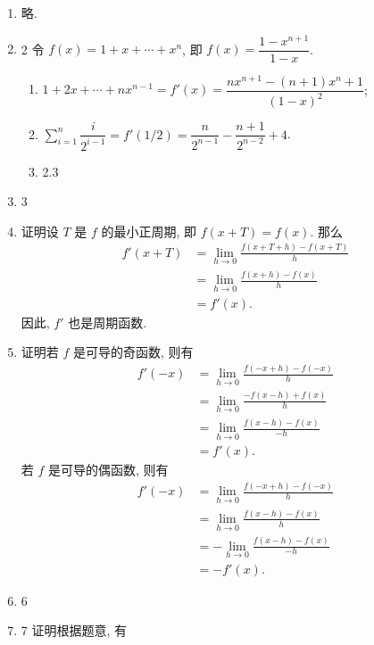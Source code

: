 \documentclass[a4paper, 11pt]{ctexart}
\begin{document}
\pagestyle{empty}
\begin{enumerate}
    \item %
        略.
    \item 2
        令 $f(x) = 1 + x + \cdots + x^n$, 即 $f(x) = \dfrac{1-x^{n+1}}{1-x}$.
        \begin{enumerate}[(1)]
            \item %
                $1 + 2x + \cdots + nx^{n-1} = f'(x) = \dfrac{nx^{n+1} - (n+1)x^n + 1}{(1-x)^2}$;
            \item %
                $\sum\limits_{i=1}^n\dfrac{i}{2^{i-1}} = f'(1/2) = \dfrac{n}{2^{n-1}} - \dfrac{n+1}{2^{n-2}} + 4$.
            \item 2.3
        \end{enumerate}
    \item 3
    \item %
        {\heiti 证明}\quad 设 $T$ 是 $f$ 的最小正周期, 即 $f(x + T) = f(x)$. 那么
        \begin{align*}
            f'(x + T) &= \lim_{h\to0}\frac{f(x+T+h) - f(x+T)}{h} \\
                      &= \lim_{h\to0}\frac{f(x+h) - f(x)}{h} \\
                      &= f'(x).    
        \end{align*}
        因此, $f'$ 也是周期函数.
    \item %
        {\heiti 证明}\quad 若 $f$ 是可导的奇函数, 则有
        \begin{align*}
            f'(-x) &= \lim_{h\to0}\frac{f(-x+h) - f(-x)}{h} \\
                   &= \lim_{h\to0}\frac{-f(x-h) + f(x)}{h} \\
                   &= \lim_{h\to0}\frac{f(x-h) - f(x)}{-h} \\
                   &= f'(x).  
        \end{align*}
        若 $f$ 是可导的偶函数, 则有
        \begin{align*}
            f'(-x) &= \lim_{h\to0}\frac{f(-x+h) - f(-x)}{h} \\
                   &= \lim_{h\to0}\frac{f(x-h) - f(x)}{h} \\
                   &= -\lim_{h\to0}\frac{f(x-h) - f(x)}{-h} \\
                   &= -f'(x).
        \end{align*}
    \item 6
    \item 7
        {\heiti 证明}\quad 根据题意, 有

\end{enumerate}
\end{document}
